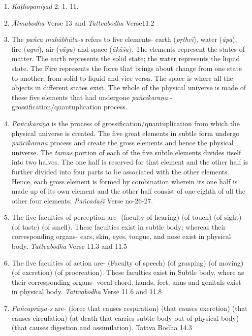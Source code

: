 \begin{enumerate}
\itemsep=0pt
\item
  \emph{Kaṭhopaniṣad} 2. 1. 11.
\item
  \emph{Ātmabodha} Verse 13 and \emph{Tattvabodha} Verse11.2
\item
  The \emph{pañca mahābhūta-s} refers to five elements- earth (\emph{pṛthvī}), water (\emph{āpa}), fire (\emph{agni}), air (\emph{vāyu}) and space (\emph{ākāśa}). The elements represent the states of matter. The earth represents the solid state; the water represents the liquid state. The Fire represents the force that brings about change from one state to another; from solid to liquid and vice versa. The space is where all the objects in different states exist. The whole of the physical universe is made of these five elements that had undergone \emph{pañcīkaraṇa} - grossification/quantuplication process.
\item
  \emph{Pañcīkaraṇa} is the process of grossification/quantuplication from which the physical universe is created. The five great elements in subtle form undergo \emph{pañcīkaraṇa} process and create the gross elements and hence the physical universe. The \emph{tamas} portion of each of the five subtle elements divides itself into two halves. The one half is reserved for that element and the other half is further divided into four parts to be associated with the other elements. Hence, each gross element is formed by combination wherein its one half is made up of its own element and the other half consist of one-eighth of all the other four elements. \emph{Pañcadaśī} Verse no-26-27.
\item
  The five faculties of perception are-  (faculty of hearing)  (of touch)  (of sight)  (of taste)  (of smell). These faculties exist in subtle body; whereas their corresponding organs- ears, skin, eyes, tongue, and nose exist in physical body. \emph{Tattvabodha} Verse 11.3 and 11.5
\item
  The five faculties of action are-  (Faculty of speech)  (of grasping)  (of moving)  (of excretion)  (of procreation). These faculties exist in Subtle body, where as their corresponding organs- vocal-chord, hands, feet, anus and genitals exist in physical body. \emph{Tattvabodha} Verse 11.6 and 11.8
\item
  \emph{Pañcaprāṇa-s} are-  (force that causes respiration)  (that causes excretion)  (that causes circulation)  (at death that carries subtle body out of physical body)  (that causes digestion and assimilation). Tattva Bodha 14.3

\end{enumerate}
